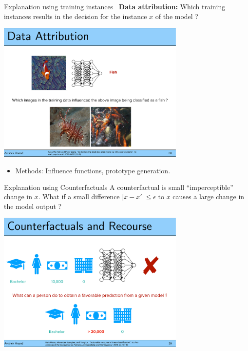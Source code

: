 \documentclass[11pt,compress,t,notes=noshow, aspectratio=169, xcolor=table]{beamer}
\begin{document}
\begin{frame}{Explanation using training instances~}
	\textbf{Data attribution:} Which training instances results in the decision for the instance $x$ of the model ?
	\begin{center}
		\includegraphics[page=1, width=0.7\textwidth]{figure/prototypes-fish.pdf}
	\end{center}
	\begin{itemize}
		\item Methods:
		Influence functions, prototype generation.
	\end{itemize}
\end{frame}

\begin{frame}{Explanation using Counterfactuals}
    A counterfactual is small ``imperceptible'' change in $x$. What if a small difference $ |x - x'| \leq \epsilon$ to $x$ causes a large change in the model output ?
	\begin{center}
	\includegraphics[page=1, width=0.7\textwidth]{figure/counterfactual.pdf}
	\end{center}

\end{frame}
\end{document}
